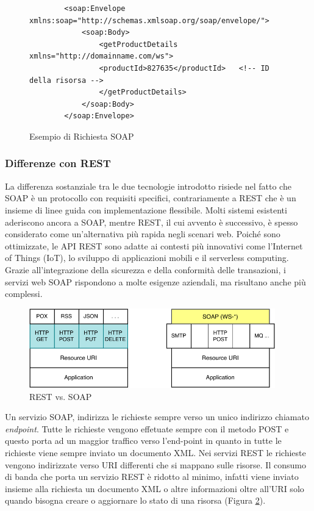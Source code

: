 \begin{figure}[H]
    \begin{verbatim}
        <soap:Envelope xmlns:soap="http://schemas.xmlsoap.org/soap/envelope/">
            <soap:Body>
                <getProductDetails xmlns="http://domainname.com/ws">
                <productId>827635</productId>   <!-- ID della risorsa -->
                </getProductDetails>
            </soap:Body>
        </soap:Envelope>
    \end{verbatim}
    \caption{Esempio di Richiesta SOAP}
    \label{fig:soaprequest}
\end{figure}


\subsubsection{Differenze con REST}
La differenza sostanziale tra le due tecnologie introdotto risiede nel fatto che SOAP è un protocollo con requisiti specifici, contrariamente a REST che è un insieme di linee guida con implementazione flessibile. Molti sistemi esistenti aderiscono ancora a SOAP, mentre REST, il cui avvento è successivo, è spesso considerato come un'alternativa più rapida negli scenari web. Poiché sono ottimizzate, le API REST sono adatte ai contesti più innovativi come l'Internet of Things (IoT), lo sviluppo di applicazioni mobili e il serverless computing. Grazie all'integrazione della sicurezza e della conformità delle transazioni, i servizi web SOAP rispondono a molte esigenze aziendali, ma risultano anche più complessi.

\begin{figure}[H]
    \centering
    \includegraphics[width=0.95\textwidth]{images/01_12_rest_vs_soap.pdf}
    \caption{REST vs. SOAP}
    \label{fig:restvssoap}
\end{figure}

Un servizio SOAP, indirizza le richieste sempre verso un unico indirizzo chiamato \textit{endpoint}. Tutte le richieste vengono effetuate sempre con il metodo POST e questo porta ad un maggior traffico verso l’end-point in quanto in tutte le richieste viene sempre inviato un documento XML. Nei servizi REST le richieste vengono indirizzate verso URI differenti che si mappano sulle risorse. Il consumo di banda che porta un servizio REST è ridotto al minimo, infatti viene inviato insieme alla richiesta un documento XML o altre informazioni oltre all’URI solo quando bisogna creare o aggiornare lo stato di una risorsa (Figura \ref{fig:restvssoap}).